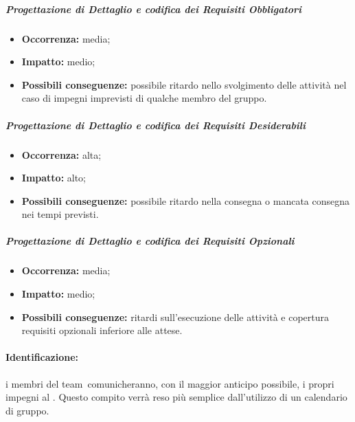 \documentclass[../PianoProgetto.tex]{subfiles}
\begin{document}
		\subparagraph*{Progettazione di Dettaglio e codifica dei Requisiti Obbligatori}
			\begin{itemize}[label={-}]
				\item \textbf{Occorrenza:} media;
				\item \textbf{Impatto:} medio;
				\item \textbf{Possibili conseguenze:} possibile ritardo nello svolgimento delle attività nel caso di impegni imprevisti di qualche membro del gruppo.
			\end{itemize}
			
		\subparagraph*{Progettazione di Dettaglio e codifica dei Requisiti Desiderabili}
			\begin{itemize}[label={-}]
				\item \textbf{Occorrenza:} alta;
				\item \textbf{Impatto:} alto;
				\item \textbf{Possibili conseguenze:} possibile ritardo nella consegna o mancata consegna nei tempi previsti.
			\end{itemize}
			
		\subparagraph*{Progettazione di Dettaglio e codifica dei Requisiti Opzionali}
			\begin{itemize}[label={-}]
				\item \textbf{Occorrenza:} media;
				\item \textbf{Impatto:} medio;
				\item \textbf{Possibili conseguenze:} ritardi sull'esecuzione delle attività e copertura requisiti opzionali inferiore alle attese.
			\end{itemize}
			
		
	\paragraph*{Identificazione:} i membri del team\g\ comunicheranno, con il maggior anticipo possibile, i propri impegni al \responsabilediprogetto . Questo compito verrà reso più semplice dall'utilizzo di un calendario di gruppo. 
	
\end{document}
